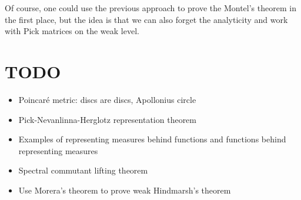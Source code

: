 Of course, one could use the previous approach to prove the Montel's theorem in the first place, but the idea is that we can also forget the analyticity and work with Pick matrices on the weak level.

\section{TODO}
\begin{itemize}
	\item Poincaré metric: discs are discs, Apollonius circle
	\item Pick-Nevanlinna-Herglotz representation theorem
	\item Examples of representing measures behind functions and functions behind representing measures
	\item Spectral commutant lifting theorem
	\item Use Morera's theorem to prove weak Hindmarsh's theorem
\end{itemize}

